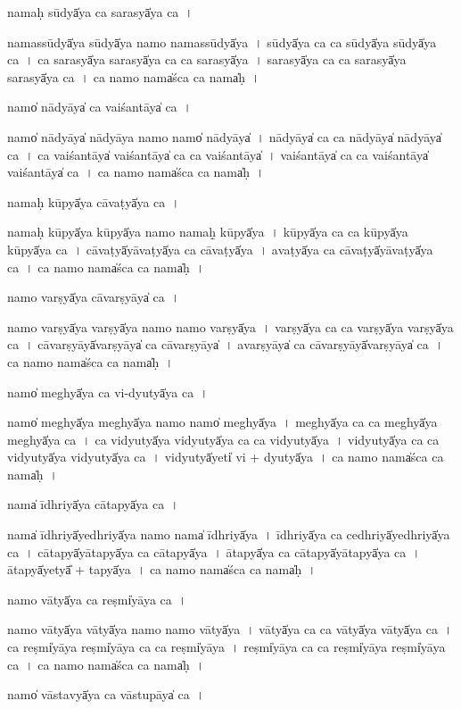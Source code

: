 \documentclass[parskip, DIV=14]{scrartcl}
\begin{document}
{nama॒ḥ sūdyā̍ya ca sara॒syā̍ya ca॒~।

nama॒ssūdyā̍ya॒ sūdyā̍ya॒ namo॒ nama॒ssūdyā̍ya~।
sūdyā̍ya ca ca॒ sūdyā̍ya॒ sūdyā̍ya ca~।
ca॒ sa॒ra॒syā̍ya sara॒syā̍ya ca ca sara॒syā̍ya~।
sa॒ra॒syā̍ya ca ca sara॒syā̍ya sara॒syā̍ya ca~।
ca॒ namo॒ nama̍śca ca॒ nama̍ḥ~।

namo̍ nā॒dyāya̍ ca vaiśa॒ntāya̍ ca॒~।

namo̍ nā॒dyāya̍ nā॒dyāya॒ namo॒ namo̍ nā॒dyāya̍~।
nā॒dyāya̍ ca ca nā॒dyāya̍ nā॒dyāya̍ ca~।
ca॒ vai॒śa॒ntāya̍ vaiśa॒ntāya̍ ca ca vaiśa॒ntāya̍~।
vai॒śa॒ntāya̍ ca ca vaiśa॒ntāya̍ vaiśa॒ntāya̍ ca~।
ca॒ namo॒ nama̍śca ca॒ nama̍ḥ~।

nama॒ḥ kūpyā̍ya cāva॒ṭyā̍ya ca॒~।

nama॒ḥ kūpyā̍ya॒ kūpyā̍ya॒ namo॒ namaḥ̱ kūpyā̍ya~।
kūpyā̍ya ca ca॒ kūpyā̍ya॒ kūpyā̍ya ca~।
cā॒va॒ṭyā̍yāva॒ṭyā̍ya ca cāva॒ṭyā̍ya~।
a॒va॒ṭyā̍ya ca cāva॒ṭyā̍yāva॒ṭyā̍ya ca~।
ca॒ namo॒ nama̍śca ca॒ nama̍ḥ~।

namo॒ varṣyā̍ya cāva॒rṣyāya̍ ca॒~।

namo॒ varṣyā̍ya॒ varṣyā̍ya॒ namo॒ namo॒ varṣyā̍ya~।
varṣyā̍ya ca ca॒ varṣyā̍ya॒ varṣyā̍ya ca~।
cā॒va॒rṣyāyā̍va॒rṣyāya̍ ca cāva॒rṣyāya̍~।
a॒va॒rṣyāya̍ ca cāva॒rṣyāyā̍va॒rṣyāya̍ ca~।
ca॒ namo॒ nama̍śca ca॒ nama̍ḥ~।

namo̍ me॒ghyā̍ya ca vi-dyu॒tyā̍ya ca॒~।

namo̍ me॒ghyā̍ya me॒ghyā̍ya॒ namo॒ namo̍ me॒ghyā̍ya~।
me॒ghyā̍ya ca ca me॒ghyā̍ya me॒ghyā̍ya ca~।
ca॒ vi॒dyu॒tyā̍ya vidyu॒tyā̍ya ca ca vidyu॒tyā̍ya~।
vi॒dyu॒tyā̍ya ca ca vidyu॒tyā̍ya vidyu॒tyā̍ya ca~।
vi॒dyu॒tyā̍yeti̍ vi + dyu॒tyā̍ya~।
ca॒ namo॒ nama̍śca ca॒ nama̍ḥ~।

nama̍ ī॒dhriyā̍ya cāta॒pyā̍ya ca॒~।

nama̍ ī॒dhriyā̍ye॒dhriyā̍ya॒ namo॒ nama̍ ī॒dhriyā̍ya~।
ī॒dhriyā̍ya ca ce॒dhriyā̍ye॒dhriyā̍ya ca~।
cā॒ta॒pyā̍yāta॒pyā̍ya ca cāta॒pyā̍ya~।
ā॒ta॒pyā̍ya ca cāta॒pyā̍yāta॒pyā̍ya ca~।
ā॒ta॒pyā̍yetyā̎ + ta॒pyā̍ya~।
ca॒ namo॒ nama̍śca ca॒ nama̍ḥ~।

namo॒ vātyā̍ya ca॒ reṣmi̍yāya ca॒~।

namo॒ vātyā̍ya॒ vātyā̍ya॒ namo॒ namo॒ vātyā̍ya~।
vātyā̍ya ca ca॒ vātyā̍ya॒ vātyā̍ya ca~।
ca॒ reṣmi̍yāya॒  reṣmi̍yāya  ca ca॒ reṣmi̍yāya~।
reṣmi̍yāya  ca ca॒ reṣmi̍yāya॒ reṣmi̍yāya ca~।
ca॒ namo॒ nama̍śca ca॒ nama̍ḥ~।

namo̍ vāsta॒vyā̍ya ca vāstu॒pāya̍ ca~।

}
\end{document}
